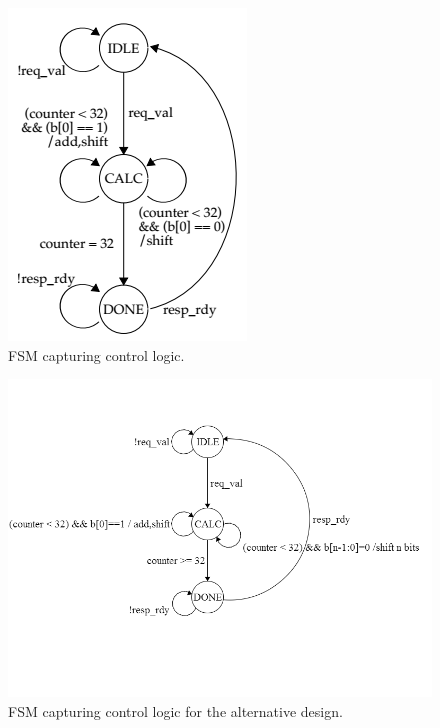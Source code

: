 \documentclass[11pt]{article}
\begin{document}
\begin{figure}[b]
\centering
\includegraphics[scale=0.6]{BaseFSM}
\caption{FSM capturing control logic.}
\label{fig:BaseFSM}
\end{figure}

\begin{figure}[b]
\centering
\includegraphics[scale=0.6]{AltFSM}
\caption{FSM capturing control logic for the alternative design.}
\label{fig:AltFSM}
\end{figure}
\end{document}
